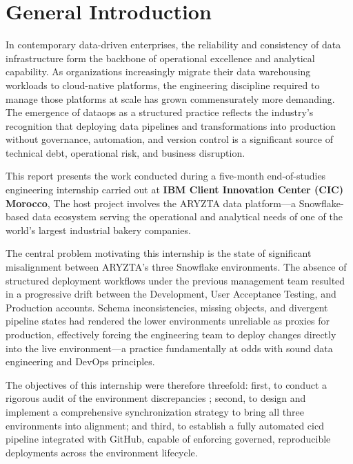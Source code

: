 \chapter*{General Introduction}

In contemporary data-driven enterprises, the reliability and consistency of data infrastructure form the backbone of operational excellence and analytical capability. As organizations increasingly migrate their data warehousing workloads to cloud-native platforms, the engineering discipline required to manage those platforms at scale has grown commensurately more demanding. The emergence of \gls{dataops} as a structured practice reflects the industry's recognition that deploying data pipelines and transformations into production without governance, automation, and version control is a significant source of technical debt, operational risk, and business disruption.

This report presents the work conducted during a five-month end-of-studies engineering internship carried out at \textbf{IBM Client Innovation Center (CIC) Morocco}, The host project involves the ARYZTA data platform---a Snowflake-based data ecosystem serving the operational and analytical needs of one of the world's largest industrial bakery companies.

The central problem motivating this internship is the state of significant misalignment between ARYZTA's three Snowflake environments. The absence of structured deployment workflows under the previous management team resulted in a progressive drift between the Development, User Acceptance Testing, and Production accounts. Schema inconsistencies, missing objects, and divergent pipeline states had rendered the lower environments unreliable as proxies for production, effectively forcing the engineering team to deploy changes directly into the live environment---a practice fundamentally at odds with sound data engineering and DevOps principles.

The objectives of this internship were therefore threefold: first, to conduct a rigorous audit of the environment discrepancies ; second, to design and implement a comprehensive synchronization strategy to bring all three environments into alignment; and third, to establish a fully automated \gls{cicd} pipeline integrated with GitHub, capable of enforcing governed, reproducible deployments across the environment lifecycle.


